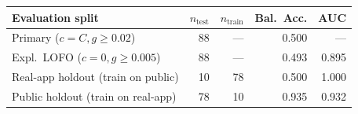 \begin{tabular}{lrrrr}
\toprule
Evaluation split & $n_{\text{test}}$ & $n_{\text{train}}$ & Bal.\ Acc. & AUC \\
\midrule
Primary ($c=C, g \ge 0.02$) & 88 & --- & 0.500 & --- \\
Expl.\ LOFO ($c=0, g \ge 0.005$) & 88 & --- & 0.493 & 0.895 \\
Real-app holdout (train on public) & 10 & 78 & 0.500 & 1.000 \\
Public holdout (train on real-app) & 78 & 10 & 0.935 & 0.932 \\
\bottomrule
\end{tabular}
